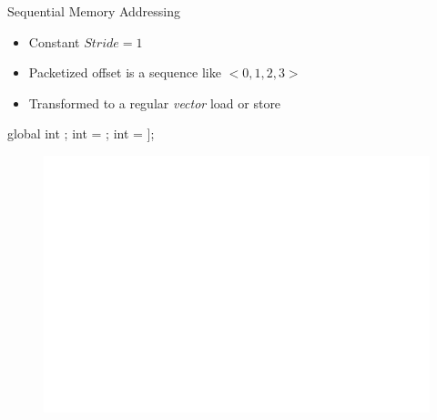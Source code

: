 
\begin{frame}[fragile]{Sequential Memory Addressing}

\begin{itemize}
    \item Constant $Stride = 1$
    \item Packetized offset is a sequence like $<0, 1, 2, 3>$
    \item Transformed to a regular \emph{vector} load or store
\end{itemize}

\begin{minipage}[t]{0.40\linewidth}
    \vspace{0.1ex}
    \begin{codebox}[commandchars=\\\[\]]

global int \uniform[*src];
int \varying[tid] = ;
int \varying[x] = \uniform[src]\idx[\varying[tid]];





    \end{codebox}
\end{minipage}
\hspace{1em}
\begin{minipage}[t]{0.49\linewidth}
    \begin{figure}
        \includegraphics[scale=0.5]{images/sequential-access.pdf}
    \end{figure}
\end{minipage}

\end{frame}

